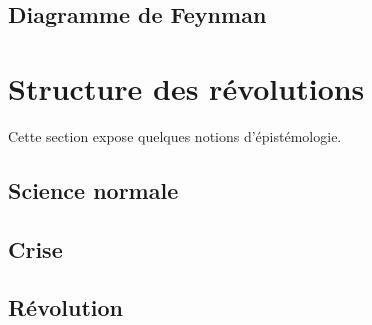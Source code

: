   \subsection{Diagramme de Feynman}


\section{Structure des révolutions}

Cette section expose quelques notions d'épistémologie.

  \subsection{Science normale}
  \subsection{Crise}
  \subsection{Révolution}





